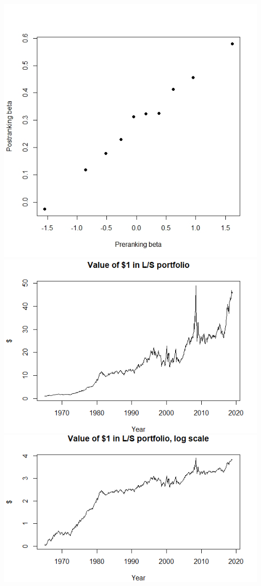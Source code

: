 \documentclass[16pt]{article}
\begin{document}
\includegraphics[width=1\textwidth]{Postranking.jpeg}
\includegraphics[width=1\textwidth]{performance.png}
\includegraphics[width=1\textwidth]{performance,log.png}
\end{document}
